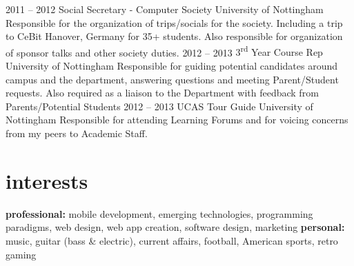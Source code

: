 \documentclass[]{friggeri-cv} %
\begin{document}
\begin{entrylist}
\entry
{2011 -- 2012}
{Social Secretary - Computer Society}
{University of Nottingham}
{Responsible for the organization of trips/socials for the society.
Including a trip to CeBit Hanover, Germany for 35+ students. Also responsible for organization of sponsor talks and other society duties.}
\entry
{2012 -- 2013}
{3\textsuperscript{rd} Year Course Rep}
{University of Nottingham}
{Responsible for guiding potential candidates around campus and the department, answering questions and meeting Parent/Student requests. Also required as a liaison to the Department with feedback from Parents/Potential Students}
\entry
{2012 -- 2013}
{UCAS Tour Guide}
{University of Nottingham}
{Responsible for attending Learning Forums and for voicing concerns from my peers to Academic Staff.}
\end{entrylist}


\section{interests}

\textbf{professional:} mobile development, emerging technologies, programming paradigms, web design, web app creation, software design, marketing \textbf{personal:} music, guitar (bass \& electric), current affairs, football, American sports, retro gaming




\end{document}
